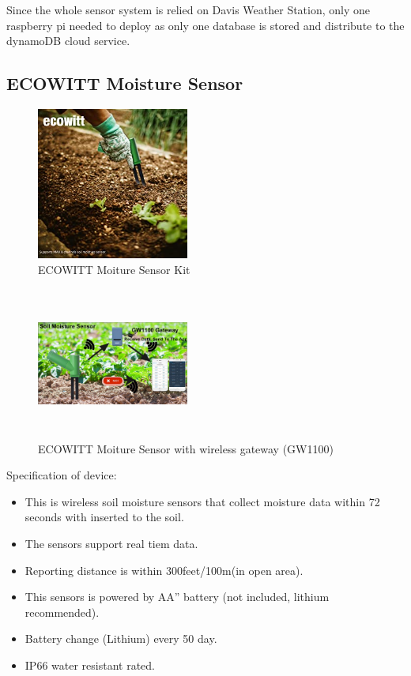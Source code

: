 \documentclass[10pt, a4paper]{article}
\begin{document}
\par Since the whole sensor system is relied on Davis Weather Station, only one raspberry pi needed to deploy as only one database is stored and distribute to the dynamoDB cloud service.
\newpage
\subsection{ECOWITT Moisture Sensor}
\begin{figure}[!ht]
  \centering
    \includegraphics[width=5cm, height=5cm]{ecowittsensors.jpg}
  \caption{ECOWITT Moiture Sensor Kit}
\end{figure}

\begin{figure}[!ht]
  \centering
    \includegraphics[width=5cm, height=5cm]{ecowittgw.jpg}
  \caption{ECOWITT Moiture Sensor with wireless gateway (GW1100)}
\end{figure}

\par Specification of device:
\begin{itemize}
\item This is wireless soil moisture sensors that collect moisture data within 72 seconds with inserted to the soil.
\item The sensors support real tiem data.
\item Reporting distance is within 300feet/100m(in open area).
\item  This sensors is powered by  AA” battery (not included, lithium recommended).
\item Battery change (Lithium) every 50 day.
\item  IP66 water resistant rated.

\end{itemize}
\end{document}
